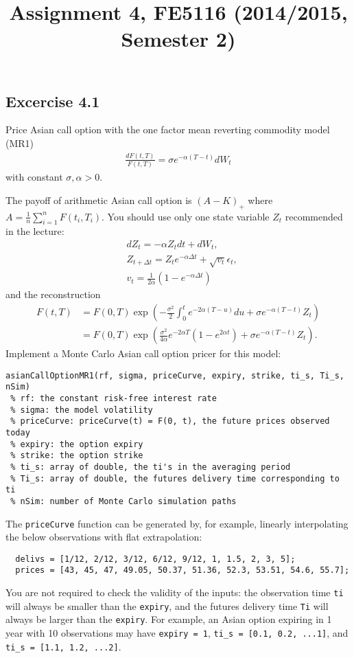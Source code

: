 \documentclass[12pt,a4paper,hidelinks,fleqn]{article}            %
\title{\vspace{-5ex}Assignment 4, FE5116 (2014/2015, Semester 2)\vspace{-7ex}}
\date{}
\begin{document}
\maketitle

\subsection*{Excercise 4.1}
Price Asian call option with the one factor mean reverting commodity model (MR1)
\begin{align}
\frac{dF(t, T)}{F(t, T)} = \sigma e^{-\alpha (T- t)} dW_t
\end{align}
with constant $\sigma, \alpha > 0$.

The payoff of arithmetic Asian call option is $(A - K)_+$ where $A = \frac{1}{n}\sum_{i=1}^n F(t_i, T_i)$. 
You should use only one state variable $Z_t$ recommended in the lecture:
\begin{align}
& dZ_t = -\alpha Z_t dt + dW_t, \\
& Z_{t+\Delta t} = Z_t e^{-\alpha \Delta t} + \sqrt{v_t} \epsilon_t, \\
& v_t = \frac{1}{2\alpha}(1 - e^{-\alpha  \Delta t})
\end{align}
and the reconstruction
\begin{align}
F(t, T) & = F(0, T) \exp\left( -\frac{\sigma^2}{2} \int_0^t e^{-2\alpha (T - u)} du + \sigma e^{-\alpha(T-t)} Z_t \right) \\
        & = F(0, T) \exp\left( \frac{\sigma^2}{4\alpha} e^{-2\alpha T} \left(1 - e^{2\alpha t}\right) + \sigma e^{-\alpha(T-t)} Z_t \right).
\end{align}
Implement a Monte Carlo Asian call option pricer for this model:
\vspace{-0.6cm}
\begin{verbatim}
asianCallOptionMR1(rf, sigma, priceCurve, expiry, strike, ti_s, Ti_s, nSim)
 % rf: the constant risk-free interest rate
 % sigma: the model volatility
 % priceCurve: priceCurve(t) = F(0, t), the future prices observed today 
 % expiry: the option expiry
 % strike: the option strike
 % ti_s: array of double, the ti's in the averaging period
 % Ti_s: array of double, the futures delivery time corresponding to ti
 % nSim: number of Monte Carlo simulation paths
\end{verbatim}
\vspace{-0.6cm}
The \verb=priceCurve= function can be generated by, for example, linearly interpolating the below observations with flat extrapolation:
\vspace{-0.6cm}
\begin{verbatim}
  delivs = [1/12, 2/12, 3/12, 6/12, 9/12, 1, 1.5, 2, 3, 5];
  prices = [43, 45, 47, 49.05, 50.37, 51.36, 52.3, 53.51, 54.6, 55.7];
\end{verbatim}
You are not required to check the validity of the inputs:
the observation time \verb=ti= will always be smaller than the \verb=expiry=, and the futures delivery time \verb=Ti= will always be larger than the \verb=expiry=.
For example, an Asian option expiring in 1 year with 10 observations may have \verb_expiry = 1_, \verb+ti_s = [0.1, 0.2, ...1]+, and \verb+ti_s = [1.1, 1.2, ...2]+.
\end{document}
